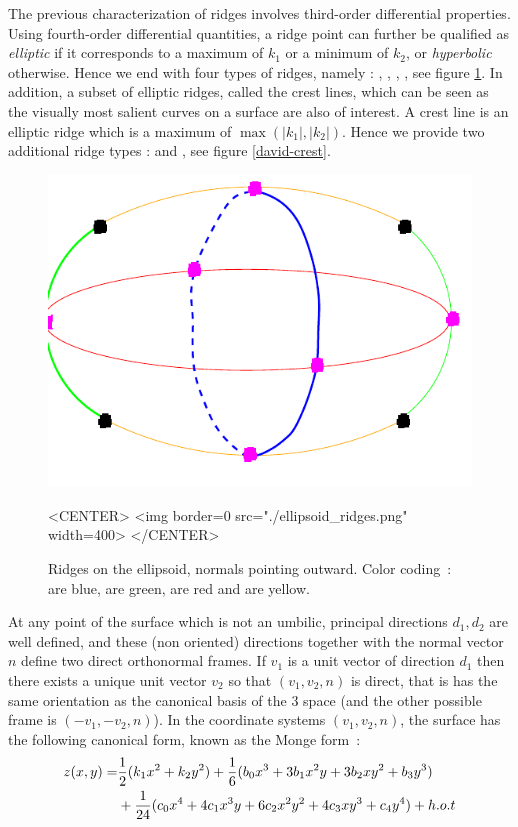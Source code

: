 The previous characterization of ridges involves third-order
differential properties. Using fourth-order differential quantities, a
ridge point can further be qualified as {\em elliptic} if it
corresponds to a maximum of $k_1$ or a minimum of $k_2$, or {\em
hyperbolic} otherwise. Hence we end with four types of ridges, namely
: , , ,
, see figure \ref{ellipsoid-ridges}.
In addition, a subset of elliptic ridges, called the crest lines,
which can be seen as the visually most salient curves on a surface are
also of interest. A crest line is an elliptic ridge which is a maximum
of $\max(|k_1|,|k_2|)$. Hence we provide two additional ridge types :
 and , see figure \ref{david-crest}.


\begin{figure}[!ht]
\begin{ccTexOnly}
\centerline{
\includegraphics[width=.5\linewidth]{Ridges_3/ellipsoid_ridges}}
\end{ccTexOnly}
\caption{Ridges on the ellipsoid, normals pointing outward.
 Color coding~:  are blue,
 are green,  are red and 
 are yellow.}
\label{ellipsoid-ridges}
\begin{ccHtmlOnly}
<CENTER> <img border=0 src="./ellipsoid_ridges.png" width=400>
</CENTER>
\end{ccHtmlOnly}
\end{figure}

At any point of the surface which is not an umbilic, principal
directions $d_1, d_2$ are well defined, and these (non oriented)
directions together with the normal vector $n$ define two direct
orthonormal frames. If $v_1$ is a unit vector of direction $d_1$ then
there exists a unique unit vector $v_2$ so that $(v_1,v_2,n)$ is
direct, that is has the same orientation as the canonical basis of the
3 space (and the other possible frame is $(-v_1,-v_2,n)$). In the
coordinate systems $(v_1,v_2,n)$, the surface has the following
canonical form, known as the Monge form~:
%
\begin{eqnarray}
\label{eq:monge}
z(x,y) =  & \frac{1}{2}(k_1x^2 + k_2y^2)+
	\frac{1}{6}(b_0x^3+3b_1x^2y+3b_2xy^2+b_3y^3) \\
  &  +\frac{1}{24}(c_0x^4+4c_1x^3y+6c_2x^2y^2+4c_3xy^3+c_4y^4) + h.o.t
\end{eqnarray}

